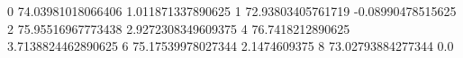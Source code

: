 0 74.03981018066406 1.011871337890625
1 72.93803405761719 -0.08990478515625
2 75.95516967773438 2.9272308349609375
4 76.7418212890625 3.7138824462890625
6 75.17539978027344 2.1474609375
8 73.02793884277344 0.0
